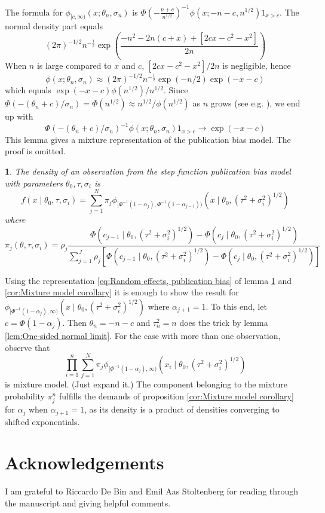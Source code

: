 \documentclass{article}
\makeatletter
\theoremstyle{plain}
\theoremstyle{plain}
\newtheorem{lem}{\protect\lemmaname}
\theoremstyle{definition}
\theoremstyle{remark}
\theoremstyle{definition}
\theoremstyle{plain}
\theoremstyle{plain}
\theoremstyle{definition}
\newenvironment{proof}[1][\protect\proofname]{\par
	\normalfont\topsep6\p@\@plus6\p@\relax
	\trivlist
	\itemindent\parindent
	\item[\hskip\labelsep\scshape #1]\ignorespaces
}{%
	\endtrivlist\@endpefalse
}
\providecommand{\proofname}{Proof}
\providecommand{\lemmaname}{Lemma}
\makeatother
\begin{document}
\begin{proof}
The formula for $\phi_{[c,\infty)}(x;\theta_{n},\sigma_{n})$
is $\Phi(-\frac{n+c}{n^{1/2}})^{-1}\phi(x;-n-c,n^{1/2})1_{x>c}$.
The normal density part equals 
\[
(2\pi)^{-1/2}n^{-\frac{1}{2}}\exp\left(\frac{-n^{2}-2n(c+x)+[2cx-c^{2}-x^{2}]}{2n}\right)
\]
When $n$ is large compared to $x$ and $c$, $[2cx-c^{2}-x^{2}]/2n$
is negligible, hence 
\[
\phi(x;\theta_{n},\sigma_{n})\approx(2\pi)^{-1/2}n^{-\frac{1}{2}}\exp(-n/2)\exp(-x-c)
\]
which equals $\exp(-x-c)\phi(n^{1/2})/n^{1/2}$.
Since $\Phi(-(\theta_{n}+c)/\sigma_{n})=\Phi(n^{1/2})\approx n^{1/2}/\phi(n^{1/2})$
as $n$ grows (see e.g. \citet[equation 5]{borjesson1979simple}),
we end up with $$\Phi(-(\theta_{n}+c)/\sigma_{n})^{-1}\phi(x;\theta_{n},\sigma_{n})1_{x>c}\to\exp(-x-c)$$
\end{proof}
%
This lemma gives a mixture representation of the publication bias
model. The proof is omitted.
\begin{lem}
\label{prop:Mixture representation} The density of an observation
from the step function publication bias model with parameters $\theta_{0},\tau,\sigma_{i}$
is
\begin{equation}
f(x\mid\theta_{0},\tau,\sigma_{i})=\sum_{j=1}^{N}\pi_{j}\phi_{[\Phi^{-1}(1-\alpha_{j}),\Phi^{-1}(1-\alpha_{j-1}))}(x\mid\theta_{0},(\tau^{2}+\sigma_{i}^{2})^{1/2})\label{eq:Random effects, publication bias}
\end{equation}
where 
\[
\pi_{j}(\theta,\tau,\sigma_{i})=\rho_{j}\frac{\Phi(c_{j-1}\mid\theta_{0},(\tau^{2}+\sigma_{i}^{2})^{1/2})-\Phi(c_{j}\mid\theta_{0},(\tau^{2}+\sigma_{i}^{2})^{1/2})}{\sum_{j=1}^{J}\rho_{j}[\Phi(c_{j-1}\mid\theta_{0},(\tau^{2}+\sigma_{i}^{2})^{1/2})-\Phi(c_{j}\mid\theta_{0},(\tau^{2}+\sigma_{i}^{2})^{1/2})]}
\]
\end{lem}

\begin{proof}[Proof of Theorem \ref{prop:p-hacking infinite confidence interval}]
Using the representation \ref{eq:Random effects, publication bias}
of lemma \ref{prop:Mixture representation} and \ref{cor:Mixture model corollary}
it is enough to show the result for $\phi_{[\Phi^{-1}(1-\alpha_{j}),\infty)}(x\mid\theta_{0},(\tau^{2}+\sigma_{i}^{2})^{1/2})$
where $\alpha_{j+1}=1$. To this end, let $c=\Phi(1-\alpha_{j})$.
Then $\theta_{n}=-n-c$ and $\tau_{n}^{2}=n$ does the trick by lemma
\ref{lem:One-sided normal limit}. For the case with more than one
observation, observe that 
\[
\prod_{i=1}^{n}\sum_{j=1}^{N}\pi_{j}\phi_{[\Phi^{-1}(1-\alpha_{j}),\infty)}(x_{i}\mid\theta_{0},(\tau^{2}+\sigma_{i}^{2})^{1/2})
\]
is mixture model. (Just expand it.) The component belonging to the
mixture probability $\pi_{j}^{n}$ fulfills the demands of proposition
\ref{cor:Mixture model corollary} for $\alpha_{j}$ when $\alpha_{j+1}=1$,
as its density is a product of densities converging to shifted exponentials.
\end{proof}


\section*{Acknowledgements}
I am grateful to Riccardo De Bin and Emil Aas Stoltenberg for reading through the manuscript and giving helpful comments.




\end{document}
